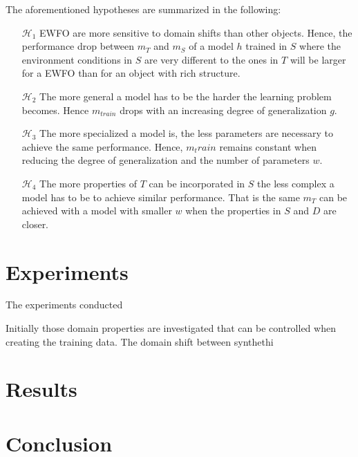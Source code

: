 The aforementioned hypotheses are summarized in the following:

\begin{enumerate}
	\item[$\mathcal{H}_1$] \ac{EWFO} are more sensitive to domain shifts than other objects. Hence, the performance drop between $m_T$ and $m_S$ of a model $h$ trained in $S$ where the environment conditions in $S$ are very different to the ones in $T$ will be larger for a \ac{EWFO} than for an object with rich structure.
	
	\item[$\mathcal{H}_2$] The more general a model has to be the harder the learning problem becomes. Hence $m_{train}$ drops with an increasing degree of generalization $g$.
	
	\item[$\mathcal{H}_3$] The more specialized a model is, the less parameters are necessary to achieve the same performance. Hence, $m_train$ remains constant when reducing the degree of generalization and the number of parameters $w$.
	
	\item[$\mathcal{H}_4$] The more properties of $T$ can be incorporated in $S$ the less complex a model has to be to achieve similar performance. That is the same $m_T$ can be achieved with a model with smaller $w$ when the properties in $S$ and $D$ are closer.
\end{enumerate}







\section{Experiments}
\label{sec:training:experiments}


The experiments conducted

Initially those domain properties are investigated that can be controlled when creating the training data. The domain shift between synthethi







\section{Results}
\label{sec:training:results}

\section{Conclusion}
\label{sec:training:conclusion}

%
